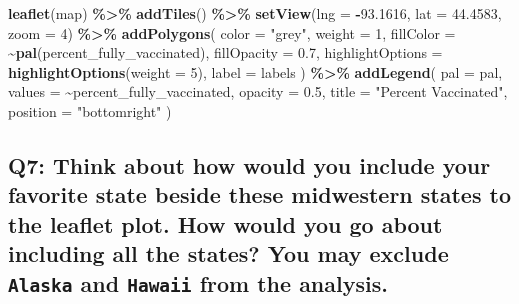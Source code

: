 \documentclass[
]{book}
\newenvironment{Shaded}{\begin{snugshade}}{\end{snugshade}}
\newcommand{\AttributeTok}[1]{\textcolor[rgb]{0.13,0.29,0.53}{#1}}
\newcommand{\DecValTok}[1]{\textcolor[rgb]{0.00,0.00,0.81}{#1}}
\newcommand{\FloatTok}[1]{\textcolor[rgb]{0.00,0.00,0.81}{#1}}
\newcommand{\FunctionTok}[1]{\textcolor[rgb]{0.13,0.29,0.53}{\textbf{#1}}}
\newcommand{\NormalTok}[1]{#1}
\newcommand{\SpecialCharTok}[1]{\textcolor[rgb]{0.81,0.36,0.00}{\textbf{#1}}}
\newcommand{\StringTok}[1]{\textcolor[rgb]{0.31,0.60,0.02}{#1}}
\begin{document}
\begin{Shaded}
\begin{Highlighting}[]
\FunctionTok{leaflet}\NormalTok{(map) }\SpecialCharTok{\%\textgreater{}\%} 
  \FunctionTok{addTiles}\NormalTok{() }\SpecialCharTok{\%\textgreater{}\%} 
  \FunctionTok{setView}\NormalTok{(}\AttributeTok{lng =} \SpecialCharTok{{-}}\FloatTok{93.1616}\NormalTok{, }\AttributeTok{lat =} \FloatTok{44.4583}\NormalTok{, }\AttributeTok{zoom =} \DecValTok{4}\NormalTok{) }\SpecialCharTok{\%\textgreater{}\%}
  \FunctionTok{addPolygons}\NormalTok{(}
    \AttributeTok{color =} \StringTok{"grey"}\NormalTok{, }
    \AttributeTok{weight =} \DecValTok{1}\NormalTok{,}
    \AttributeTok{fillColor =} \SpecialCharTok{\textasciitilde{}}\FunctionTok{pal}\NormalTok{(percent\_fully\_vaccinated), }
    \AttributeTok{fillOpacity =} \FloatTok{0.7}\NormalTok{,}
    \AttributeTok{highlightOptions =} \FunctionTok{highlightOptions}\NormalTok{(}\AttributeTok{weight =} \DecValTok{5}\NormalTok{),}
    \AttributeTok{label =}\NormalTok{ labels}
\NormalTok{  ) }\SpecialCharTok{\%\textgreater{}\%}
  \FunctionTok{addLegend}\NormalTok{(}
    \AttributeTok{pal =}\NormalTok{ pal, }
    \AttributeTok{values =} \SpecialCharTok{\textasciitilde{}}\NormalTok{percent\_fully\_vaccinated, }
    \AttributeTok{opacity =} \FloatTok{0.5}\NormalTok{, }
    \AttributeTok{title =} \StringTok{"Percent Vaccinated"}\NormalTok{, }
    \AttributeTok{position =} \StringTok{"bottomright"}
\NormalTok{  )}
\end{Highlighting}
\end{Shaded}

\hypertarget{q7-think-about-how-would-you-include-your-favorite-state-beside-these-midwestern-states-to-the-leaflet-plot.-how-would-you-go-about-including-all-the-states-you-may-exclude-alaska-and-hawaii-from-the-analysis.}{%
\subsection{\texorpdfstring{Q7: Think about how would you include your favorite state beside these midwestern states to the leaflet plot. How would you go about including all the states? You may exclude \texttt{Alaska} and \texttt{Hawaii} from the analysis.}{Q7: Think about how would you include your favorite state beside these midwestern states to the leaflet plot. How would you go about including all the states? You may exclude Alaska and Hawaii from the analysis.}}\label{q7-think-about-how-would-you-include-your-favorite-state-beside-these-midwestern-states-to-the-leaflet-plot.-how-would-you-go-about-including-all-the-states-you-may-exclude-alaska-and-hawaii-from-the-analysis.}}
\end{document}
